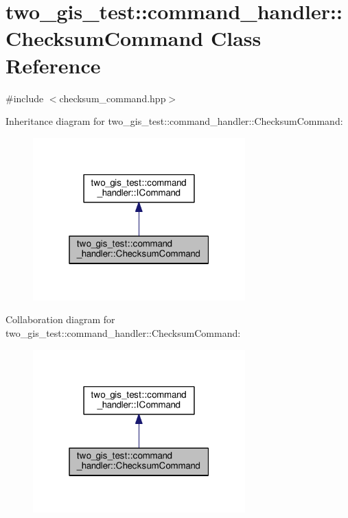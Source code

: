 \hypertarget{classtwo__gis__test_1_1command__handler_1_1_checksum_command}{}\section{two\+\_\+gis\+\_\+test\+:\+:command\+\_\+handler\+:\+:Checksum\+Command Class Reference}
\label{classtwo__gis__test_1_1command__handler_1_1_checksum_command}


{\ttfamily \#include $<$checksum\+\_\+command.\+hpp$>$}



Inheritance diagram for two\+\_\+gis\+\_\+test\+:\+:command\+\_\+handler\+:\+:Checksum\+Command\+:\nopagebreak
\begin{figure}[H]
\begin{center}
\leavevmode
\includegraphics[width=232pt]{classtwo__gis__test_1_1command__handler_1_1_checksum_command__inherit__graph}
\end{center}
\end{figure}


Collaboration diagram for two\+\_\+gis\+\_\+test\+:\+:command\+\_\+handler\+:\+:Checksum\+Command\+:\nopagebreak
\begin{figure}[H]
\begin{center}
\leavevmode
\includegraphics[width=232pt]{classtwo__gis__test_1_1command__handler_1_1_checksum_command__coll__graph}
\end{center}
\end{figure}
